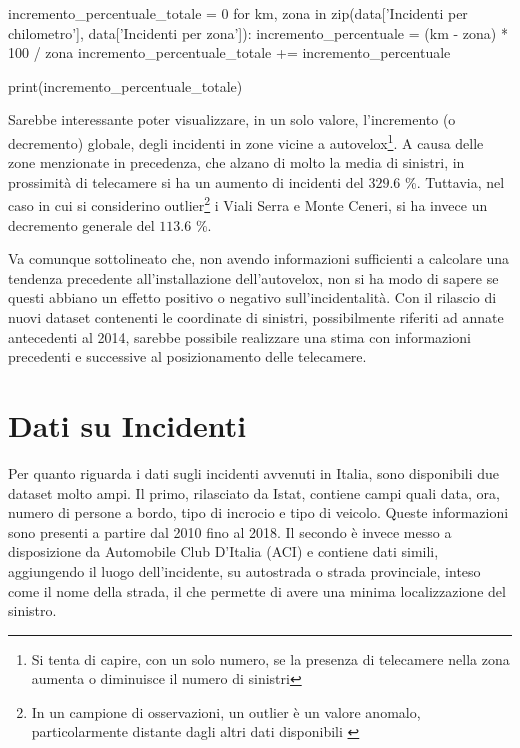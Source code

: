 \documentclass[a4paper,12pt]{report}
\begin{document}
\begin{code}
incremento_percentuale_totale = 0
for km, zona in zip(data['Incidenti per chilometro'], data['Incidenti per zona']): 
    incremento_percentuale = (km - zona) * 100 / zona
    incremento_percentuale_totale += incremento_percentuale

print(incremento_percentuale_totale)
\end{code}

Sarebbe interessante poter visualizzare, in un solo valore, 
l'incremento (o decremento) 
globale, degli incidenti in zone vicine a 
autovelox\footnote{Si tenta di capire, con un solo numero, se la presenza di 
telecamere nella zona aumenta o diminuisce il numero di sinistri}. 
A causa delle zone menzionate in precedenza, che alzano di molto la media di sinistri, 
in prossimità di telecamere si ha un aumento di 
incidenti del $329.6$ \%. 
Tuttavia, nel caso in cui si considerino 
outlier\footnote{In un campione di osservazioni, un outlier è un valore anomalo, 
particolarmente distante dagli altri dati disponibili \cite{PROB_E_STATISTICA:1}} 
i Viali Serra e Monte Ceneri, si ha invece un decremento generale del $113.6$ \%. 

Va comunque sottolineato che, non avendo informazioni sufficienti a calcolare una tendenza 
precedente all'installazione dell'autovelox, non si ha modo di sapere se questi abbiano un 
effetto positivo o negativo sull'incidentalità. 
Con il rilascio di nuovi dataset contenenti le coordinate di sinistri, 
possibilmente riferiti ad annate antecedenti al 2014, sarebbe possibile realizzare 
una stima con informazioni precedenti e 
successive al posizionamento delle telecamere. 

\chapter{Dati su Incidenti}

Per quanto riguarda i dati sugli incidenti avvenuti in Italia, 
sono disponibili due dataset molto ampi. 
Il primo, rilasciato da Istat, contiene campi quali data, ora, 
numero di persone a bordo, tipo di incrocio e tipo di veicolo. 
Queste informazioni sono presenti a partire dal 2010 fino al 2018. 
Il secondo è invece messo a disposizione da Automobile Club D'Italia (ACI) 
e contiene dati simili, 
aggiungendo il luogo dell'incidente, su autostrada o strada provinciale, 
inteso come il nome della strada, il che permette di avere una minima localizzazione del 
sinistro. 
\end{document}
